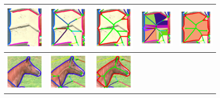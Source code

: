 \begin{figure}[pht]
\begin{tabular}{|c|c|c|c|c|}
\includegraphics[width=0.16\linewidth]{figs/118035_00_rc_cons.pdf} &
\includegraphics[width=0.16\linewidth]{figs/118035_00_rc_before_shocks.pdf} &
\includegraphics[width=0.16\linewidth]{figs/118035_00_rc_after_shocks.pdf} &
\includegraphics[width=0.16\linewidth]{figs/118035_00_rc_before_frags.pdf} &
\includegraphics[width=0.16\linewidth]{figs/118035_00_rc_after_frags.pdf}\\
\hline
\includegraphics[width=0.16\linewidth]{figs/113044_00_rc_cons.pdf} &
\includegraphics[width=0.16\linewidth]{figs/113044_00_rc_before_shocks.pdf} &
\includegraphics[width=0.16\linewidth]{figs/113044_00_rc_after_shocks.pdf} &

\end{tabular}
\end{figure}
